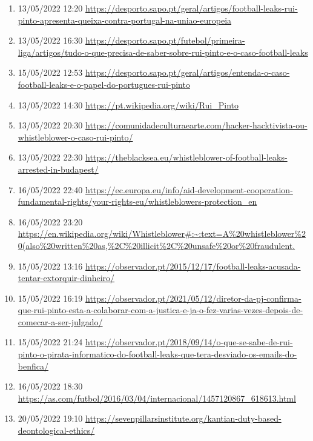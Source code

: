 

\begin{enumerate}
    \item\label{bib:sapo:queixa}
    13/05/2022 12:20 \url{https://desporto.sapo.pt/geral/artigos/football-leaks-rui-pinto-apresenta-queixa-contra-portugal-na-uniao-europeia}
    \item\label{bib:sapo:geral1}
    13/05/2022 16:30 \url{https://desporto.sapo.pt/futebol/primeira-liga/artigos/tudo-o-que-precisa-de-saber-sobre-rui-pinto-e-o-caso-football-leaks}
    \item\label{bib:sapo:geral2}
    15/05/2022 12:53 \url{https://desporto.sapo.pt/geral/artigos/entenda-o-caso-football-leaks-e-o-papel-do-portugues-rui-pinto}
    
    \item\label{bib:wiki}
    13/05/2022 14:30 \url{https://pt.wikipedia.org/wiki/Rui_Pinto}
    \item\label{bib:comunidadeculturaearte}
    13/05/2022 20:30 \url{https://comunidadeculturaearte.com/hacker-hacktivista-ou-whistleblower-o-caso-rui-pinto/}
    \item\label{bib:theblacksea}
    13/05/2022 22:30 \url{https://theblacksea.eu/whistleblower-of-football-leaks-arrested-in-budapest/}
    \item\label{bib:whistleblowers-protection_en}
    16/05/2022 22:40 \url{https://ec.europa.eu/info/aid-development-cooperation-fundamental-rights/your-rights-eu/whistleblowers-protection_en}
    \item\label{bib:wiki:whistleblower}
    16/05/2022 23:20 \url{https://en.wikipedia.org/wiki/Whistleblower#:~:text=A%20whistleblower%20(also%20written%20as,%2C%20illicit%2C%20unsafe%20or%20fraudulent.}
    
    \item\label{bib:observador:extorsao}
    15/05/2022 13:16 \url{https://observador.pt/2015/12/17/football-leaks-acusada-tentar-extorquir-dinheiro/}
    \item\label{bib:observador:colaborar}
    15/05/2022 16:19 \url{https://observador.pt/2021/05/12/diretor-da-pj-confirma-que-rui-pinto-esta-a-colaborar-com-a-justica-e-ja-o-fez-varias-vezes-depois-de-comecar-a-ser-julgado/}
    \item\label{bib:observador:emails} 
    
    15/05/2022 21:24 \url{https://observador.pt/2018/09/14/o-que-se-sabe-de-rui-pinto-o-pirata-informatico-do-football-leaks-que-tera-desviado-os-emails-do-benfica/}
    \item\label{bib:as}
     16/05/2022 18:30 \url{https://as.com/futbol/2016/03/04/internacional/1457120867_618613.html}
    \item\label{bib:kant}
     20/05/2022 19:10 \url{https://sevenpillarsinstitute.org/kantian-duty-based-deontological-ethics/}
\end{enumerate}

